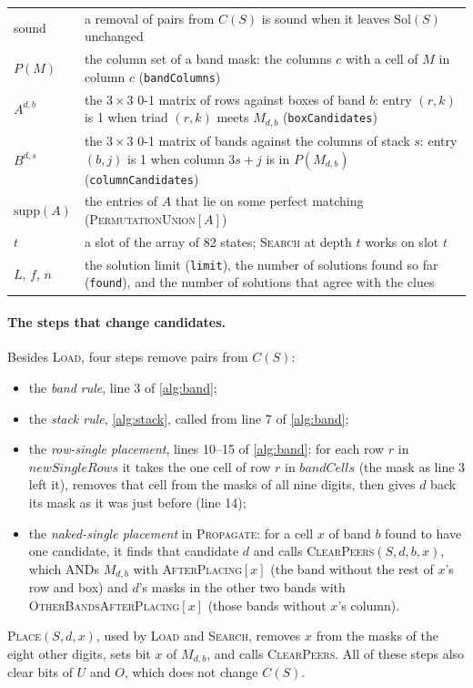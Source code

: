 \documentclass[11pt]{article}
\theoremstyle{definition}
\theoremstyle{plain}
\let\origtextsc\textsc
\renewcommand{\textsc}[1]{\textup{\origtextsc{#1}}}
\begin{document}
\begin{table}[h!]
\begin{tabular}{l>{\raggedright\arraybackslash}p{11.2cm}}
sound & a removal of pairs from $C(S)$ is sound when it leaves $\mathrm{Sol}(S)$ unchanged \\
$P(M)$ & the column set of a band mask: the columns $c$ with a cell of $M$ in column $c$ (\texttt{bandColumns}) \\
$A^{d,b}$ & the $3\times 3$ 0-1 matrix of rows against boxes of band $b$: entry $(r,k)$ is 1 when triad $(r,k)$ meets
  $M_{d,b}$ (\texttt{boxCandidates}) \\
$B^{d,s}$ & the $3\times 3$ 0-1 matrix of bands against the columns of stack $s$: entry $(b,j)$ is 1 when column $3s+j$
  is in $P(M_{d,b})$ (\texttt{columnCandidates}) \\
$\mathrm{supp}(A)$ & the entries of $A$ that lie on some perfect matching (\textsc{PermutationUnion}$[A]$) \\
$t$ & a slot of the array of 82 states; \textsc{Search} at depth $t$ works on slot $t$ \\
$L$, $f$, $n$ & the solution limit (\texttt{limit}), the number of solutions found so far (\texttt{found}), and the
  number of solutions that agree with the clues \\
\bottomrule
\end{tabular}
\end{table}

\paragraph{The steps that change candidates.} Besides \textsc{Load}, four steps remove pairs from $C(S)$:
\begin{itemize}
\item the \emph{band rule}, line 3 of \cref{alg:band};
\item the \emph{stack rule}, \cref{alg:stack}, called from line 7 of \cref{alg:band};
\item the \emph{row-single placement}, lines 10--15 of \cref{alg:band}: for each row $r$ in $\mathit{newSingleRows}$ it
  takes the one cell of row $r$ in $\mathit{bandCells}$ (the mask as line 3 left it), removes that cell from the masks
  of all nine digits, then gives $d$ back its mask as it was just before (line 14);
\item the \emph{naked-single placement} in \textsc{Propagate}: for a cell $x$ of band $b$ found to have one candidate,
  it finds that candidate $d$ and calls \textsc{ClearPeers}$(S,d,b,x)$, which ANDs $M_{d,b}$ with
  \textsc{AfterPlacing}$[x]$ (the band without the rest of $x$'s row and box) and $d$'s masks in the other two bands
  with \textsc{OtherBandsAfterPlacing}$[x]$ (those bands without $x$'s column).
\end{itemize}
\textsc{Place}$(S,d,x)$, used by \textsc{Load} and \textsc{Search}, removes $x$ from the masks of the eight other
digits, sets bit $x$ of $M_{d,b}$, and calls \textsc{ClearPeers}. All of these steps also clear bits of $U$ and $O$,
which does not change $C(S)$.
\end{document}
